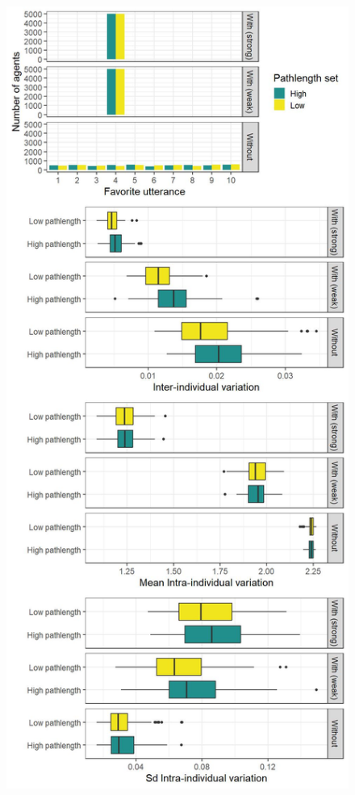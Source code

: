 \documentclass[
]{article}
\begin{document}
\begin{figure}[!H]

{\centering \includegraphics{./Figures/unnamed-chunk-32-1} 

}


\end{figure}
\end{document}

